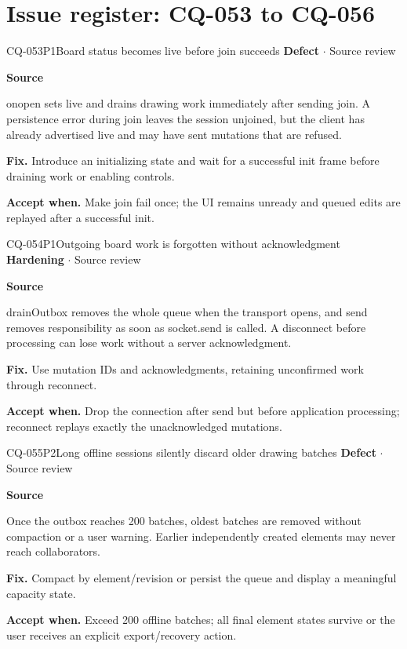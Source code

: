 \section*{Issue register: CQ-053 to CQ-056}
\begin{finding}{CQ-053}{P1}{Board status becomes live before join succeeds}
\textbf{Defect} $\cdot$ Source review\par
\textbf{Source}\quad{}\par
onopen sets live and drains drawing work immediately after sending join. A persistence error during join leaves the session unjoined, but the client has already advertised live and may have sent mutations that are refused.\par
\textbf{Fix.} Introduce an initializing state and wait for a successful init frame before draining work or enabling controls.\par
\textbf{Accept when.} Make join fail once; the UI remains unready and queued edits are replayed after a successful init.
\end{finding}
\begin{finding}{CQ-054}{P1}{Outgoing board work is forgotten without acknowledgment}
\textbf{Hardening} $\cdot$ Source review\par
\textbf{Source}\quad{}\par
drainOutbox removes the whole queue when the transport opens, and send removes responsibility as soon as socket.send is called. A disconnect before processing can lose work without a server acknowledgment.\par
\textbf{Fix.} Use mutation IDs and acknowledgments, retaining unconfirmed work through reconnect.\par
\textbf{Accept when.} Drop the connection after send but before application processing; reconnect replays exactly the unacknowledged mutations.
\end{finding}
\begin{finding}{CQ-055}{P2}{Long offline sessions silently discard older drawing batches}
\textbf{Defect} $\cdot$ Source review\par
\textbf{Source}\quad{}\par
Once the outbox reaches 200 batches, oldest batches are removed without compaction or a user warning. Earlier independently created elements may never reach collaborators.\par
\textbf{Fix.} Compact by element/revision or persist the queue and display a meaningful capacity state.\par
\textbf{Accept when.} Exceed 200 offline batches; all final element states survive or the user receives an explicit export/recovery action.
\end{finding}

